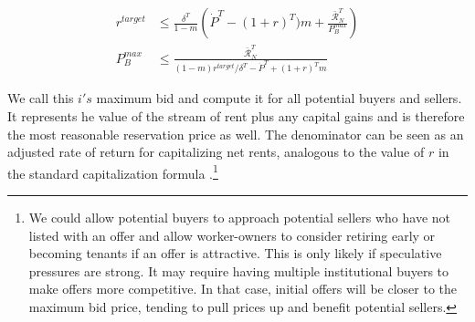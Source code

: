 {\begin{align}
r^{target}& \le \frac{\delta^T}{1-m} \left(\dot P^T - (1+r)^T)m  + \frac{\mathcal{\bar{R}}^T_N}{P_B^{max}}\right)\nonumber\\
P_B^{max} &\le  \frac{\mathcal{\bar{R}}^T_N}{(1-m)r^{target}/\delta^T - \dot P^T + (1+r)^Tm} \label{eqn:maximum-bid}
\end{align}

We call this  $i's$ maximum bid and compute it for all potential buyers and sellers. It represents he value of the stream of rent plus any capital gains and is therefore the most reasonable reservation price as well.
The denominator can be seen as an adjusted rate of return for capitalizing net rents, analogous to the value of $r$ in  the standard capitalization formula
.\footnote{We could allow potential buyers  to approach potential sellers who have not listed with an offer and allow worker-owners to consider retiring early or becoming tenants if an offer is attractive.  This is only likely if speculative pressures are strong. It may require having multiple institutional buyers to make offers more competitive. In that case, initial offers will be closer to the maximum bid price, tending to pull prices up and benefit potential sellers.}  
}

